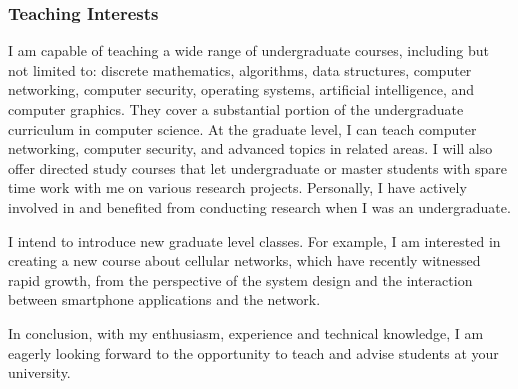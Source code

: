 \documentclass[10pt]{article}
\begin{document}
\begin{small}
\subsubsection*{Teaching Interests}

I am capable of teaching a wide range of undergraduate courses, including but not limited to: discrete mathematics, algorithms, data structures, computer networking, computer security, operating systems, artificial intelligence, and computer graphics. They cover a substantial portion of the undergraduate curriculum in computer science. At the graduate level, I can teach computer networking, computer security, and advanced topics in related areas. I will also offer directed study courses that let undergraduate or master students with spare time work with me on various research projects. Personally, I have actively involved in and benefited from conducting research when I was an undergraduate.

I intend to introduce new graduate level classes. For example, I am interested in creating a new course about cellular networks, which have recently witnessed rapid growth, from the perspective of the system design and the interaction between smartphone applications and the network.

In conclusion, with my enthusiasm, experience and technical knowledge, I am eagerly looking forward to the opportunity to teach and advise students at your university.

\end{small}
\end{document}
